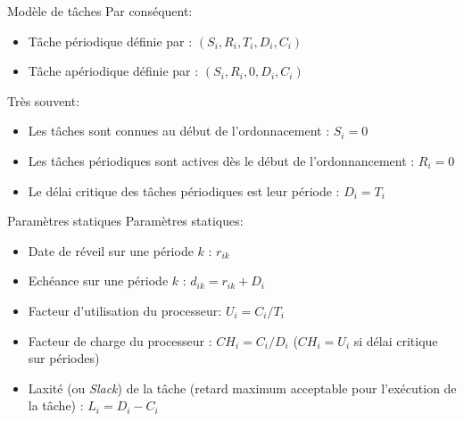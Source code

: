 \begin{frame}{Modèle de tâches}
  Par conséquent: 
  \begin{itemize} 
  \item Tâche périodique définie par : $(S_i, R_i, T_i ,D_i, C_i)$
  \item Tâche apériodique définie par : $(S_i, R_i, 0, D_i, C_i)$
  \end{itemize} 
  Très souvent:
  \begin{itemize}
    \item Les tâches sont connues au début de l'ordonnacement : $S_i = 0$
    \item Les tâches périodiques sont actives dès le début de
      l'ordonnancement : $R_i = 0$
    \item Le délai critique des  tâches périodiques est leur période  : $D_i =
      T_i$
  \end{itemize}
\end{frame}

\begin{frame}{Paramètres statiques}
  Paramètres statiques:
  \begin{itemize} 
  \item Date de réveil sur une période $k$ : $r_{ik}$
  \item Echéance sur une période $k$ : $d_{ik} = r_{ik} + D_i$
  \item Facteur d'utilisation du processeur: $U_i =  C_i / T_i$
  \item Facteur de charge du processeur : $CH_i = C_i / D_i $ ($CH_i =
    U_i$ si délai critique sur périodes)
  \item Laxité (ou \emph{Slack}) de la tâche (retard maximum acceptable pour l'exécution
    de la tâche) : $L_i = D_i - C_i$
  \end{itemize} 
\end{frame}

